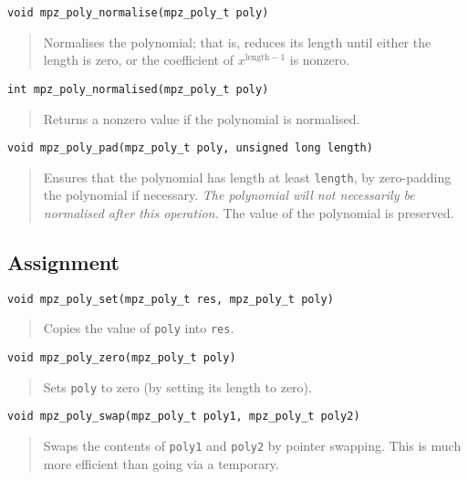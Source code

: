 \documentclass[a4paper,10pt]{article}
\newcommand{\code}{\lstinline}
\begin{document}
\begin{lstlisting}
void mpz_poly_normalise(mpz_poly_t poly)
\end{lstlisting}
\begin{quote}
Normalises the polynomial; that is, reduces its length until either the length is zero, or the coefficient of $x^{\text{length} - 1}$ is nonzero.
\end{quote}

\begin{lstlisting}
int mpz_poly_normalised(mpz_poly_t poly)
\end{lstlisting}
\begin{quote}
Returns a nonzero value if the polynomial is normalised.
\end{quote}


\begin{lstlisting}
void mpz_poly_pad(mpz_poly_t poly, unsigned long length)
\end{lstlisting}
\begin{quote}
Ensures that the polynomial has length at least \code{length}, by zero-padding the polynomial if necessary. \emph{The polynomial will not necessarily be normalised after this operation.} The value of the polynomial is preserved.
\end{quote}



\subsection{Assignment}

\begin{lstlisting}
void mpz_poly_set(mpz_poly_t res, mpz_poly_t poly)
\end{lstlisting}
\begin{quote}
Copies the value of \code{poly} into \code{res}.
\end{quote}

\begin{lstlisting}
void mpz_poly_zero(mpz_poly_t poly)
\end{lstlisting}
\begin{quote}
Sets \code{poly} to zero (by setting its length to zero).
\end{quote}

\begin{lstlisting}
void mpz_poly_swap(mpz_poly_t poly1, mpz_poly_t poly2)
\end{lstlisting}
\begin{quote}
Swaps the contents of \code{poly1} and \code{poly2} by pointer swapping. This is much more efficient than going via a temporary.
\end{quote}
\end{document}
